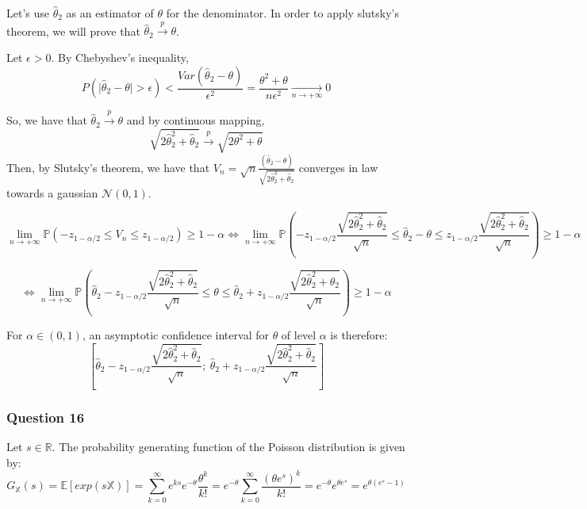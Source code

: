 \documentclass[]{article}
\begin{document}
Let's use \(\hat\theta_{2}\) as an estimator of \(\theta\) for the
denominator. In order to apply slutsky's theorem, we will prove that
\(\hat\theta_{2} \overset{p} {\to} \theta\).

Let \(\epsilon > 0\). By Chebyshev's inequality, \[
P(\mid \hat\theta_{2} - \theta \mid > \epsilon) < \frac{Var(\hat\theta_{2} - \theta)} {\epsilon^2} = \frac{\theta^2 + \theta} {n\epsilon^2} \underset{n \to + \infty} {\to} 0
\]

So, we have that \(\hat\theta_{2} \overset{p} {\to} \theta\) and by
continuous mapping,
\[\sqrt{2\hat\theta_{2}^2 + \hat\theta_{2}} \overset{p} {\to} \sqrt{2\theta^2 + \theta}\]
Then, by Slutsky's theorem, we have that
\(V_n =\sqrt{n}\frac{(\hat\theta_{2}-\theta)}{\sqrt{2\hat\theta_{2}^2 + \hat\theta_{2}}}\)
converges in law towards a gaussian \(\mathcal{N}(0,1)\).

\[
\lim \limits_{n \rightarrow + \infty} \mathbb{P} (-z_{1-\alpha/2} \leq V_n \leq z_{1-\alpha/2}) \geq 1- \alpha \Leftrightarrow \lim \limits_{n \rightarrow + \infty} \mathbb{P}(-z_{1-\alpha/2} \frac{\sqrt{2\hat\theta_{2}^2 + \hat\theta_{2}}} {\sqrt{n}} \leq \hat\theta_{2} - \theta \leq z_{1-\alpha/2} \frac{\sqrt{2\hat\theta_{2}^2 + \hat\theta_{2}}} {\sqrt{n}}) \geq 1- \alpha
\]

\[
 \Leftrightarrow \lim \limits_{n \rightarrow + \infty} \mathbb{P} (\hat\theta_{2} - z_{1-\alpha/2} \frac{\sqrt{2\hat\theta_{2}^2 + \hat\theta_{2}}} {\sqrt{n}} \leq \theta \leq \hat\theta_{2} + z_{1-\alpha/2} \frac{\sqrt{2\hat\theta_{2}^2 + \hat\theta_{2}}} {\sqrt{n}}) \geq 1- \alpha
\]

For \(\alpha \in (0, 1)\), an asymptotic confidence interval for
\(\theta\) of level \(\alpha\) is therefore: \[
[\hat\theta_{2} - z_{1-\alpha/2} \frac{\sqrt{2\hat\theta_{2}^2 + \hat\theta_{2}}} {\sqrt{n}};\ \hat\theta_{2} + z_{1-\alpha/2} \frac{\sqrt{2\hat\theta_{2}^2 + \hat\theta_{2}}} {\sqrt{n}}]
\]

\hypertarget{question-16}{%
\subsubsection{Question 16}\label{question-16}}

Let \(s \in \mathbb{R}\). The probability generating function of the
Poisson distribution is given by: \[
G_\mathbb{X} (s) = \mathbb{E}[exp(s\mathbb{X})] = \sum _{k=0} ^{\infty} e^{ks} e^{-\theta} \frac{\theta^k}{k!} = e^{-\theta} \sum _{k=0} ^{\infty} \frac{(\theta e^s)^k}{k!} = e^{-\theta} e^{\theta e^{s}} = e^{\theta(e^{s}-1)}
\]
\end{document}
